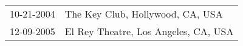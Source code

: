 \begin{supertabular}{ll}
 10-21-2004 &      The Key Club, Hollywood, CA, USA \\
 12-09-2005 &  El Rey Theatre, Los Angeles, CA, USA \\
\end{supertabular}
